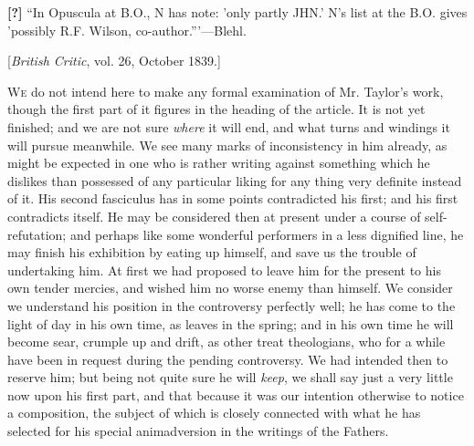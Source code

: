 
\textbf{[?]} ``In
Opuscula at B.O., N has note: 'only partly JHN.' N's list at the B.O.
gives 'possibly R.F. Wilson, co-author.'''—Blehl.

[\emph{British
Critic}, vol. 26, October 1839.]

W\textsc{e} do not intend here
to make any formal examination of Mr. Taylor's work, though the first
part of it figures in the heading of the article. It is not yet
finished; and we are not sure \emph{where} it will end, and what turns
and windings it will pursue meanwhile. We see many marks of
inconsistency in him already, as might be expected in one who is rather
writing against something which he dislikes than possessed of any
particular liking for any thing very definite instead of it. His second
fasciculus has in some points contradicted his first; and his first
contradicts itself. He may be considered then at present under a course
of self-refutation; and perhaps like some wonderful performers in a less
dignified line, he may finish his exhibition by eating up himself, and
save us the trouble of undertaking him. At first we had proposed to
leave him for the present to his own tender mercies, and wished him no
worse enemy than himself. We consider we understand his position in the
controversy perfectly well; he has come to the light of day in his own
time, as leaves in the spring; and in his own time he will become sear,
crumple up and drift, as other treat theologians, who for a while have
been in request during the pending controversy. We had intended then to
reserve him; but being not quite sure he will \emph{keep}, we shall say
just a very little now upon his first part, and that because it was our
intention otherwise to notice a composition, the subject of which is
closely connected with what he has selected for his special
animadversion in the writings of the Fathers.

